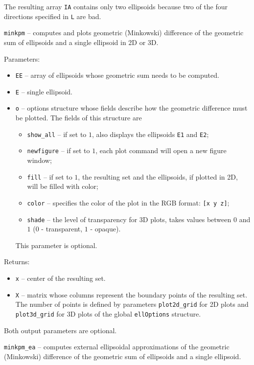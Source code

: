 
The resulting array {\tt IA} contains only two ellipsoids because two
of the four directions specified in {\tt L} are bad.

\newpage

{\Large {\tt minkpm}} -- computes and plots geometric (Minkowski) difference of
the geometric sum of ellipsoids and a single ellipsoid in 2D or 3D.

Parameters:
\begin{itemize}
\item {\tt EE} -- array of ellipsoids whose geometric sum needs to be computed.
\item {\tt E} -- single ellipsoid.
\item {\tt o} -- options structure whose fields describe how the geometric
difference must be plotted. The fields of this structure are
\begin{itemize}
\item {\tt show\_all} -- if set to $1$, also displays the ellipsoids
{\tt E1} and {\tt E2};
\item {\tt newfigure} -- if set to $1$, each plot command will open a new
figure window;
\item {\tt fill} -- if set to $1$, the resulting set and the ellipsoids,
if plotted in 2D, will be filled with color;
\item {\tt color} -- specifies the color of the plot in the RGB format:
{\tt [x y z]};
\item {\tt shade} -- the level of transparency for 3D plots, takes values
between $0$ and $1$ ($0$ - transparent, $1$ - opaque).
\end{itemize}
This parameter is optional.
\end{itemize}

Returns:
\begin{itemize}
\item {\tt x} -- center of the resulting set.
\item {\tt X} -- matrix whose columns represent the boundary points of the
resulting set. The number of points is defined by parameters
{\tt plot2d\_grid} for 2D plots and {\tt plot3d\_grid} for 3D plots of the
global {\tt ellOptions} structure.
\end{itemize}
Both output parameters are optional.

\newpage

{\Large {\tt minkpm\_ea}} -- computes external ellipsoidal approximations
of the geometric (Minkowski) difference of the geometric sum of ellipsoids
and a single ellipsoid.

